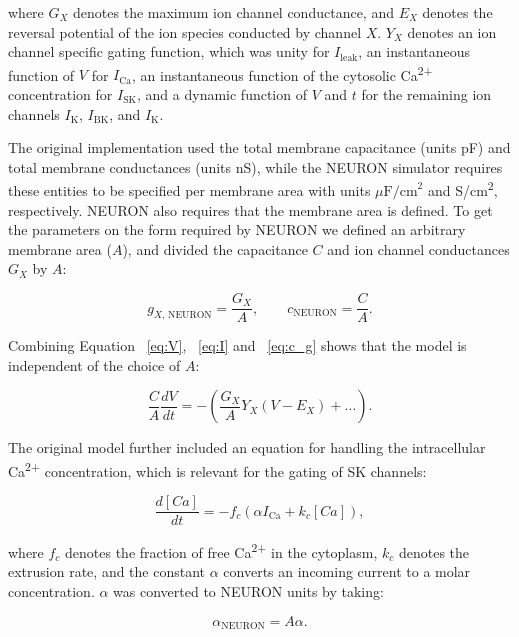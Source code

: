 \documentclass[10pt,a4paper,onecolumn]{article}
\begin{document}
\noindent
where \(G_{X}\) denotes the maximum ion channel conductance, and
\(E_{X}\) denotes the reversal potential of the ion species conducted by
channel \(X\). \(Y_X\) denotes an ion channel specific gating function,
which was unity for \(I_{\mathrm{leak}}\), an instantaneous function of
\(V\) for \(I_{\mathrm{Ca}}\), an instantaneous function of the
cytosolic Ca\textsuperscript{2+} concentration for \(I_{\mathrm{SK}}\),
and a dynamic function of \(V\) and \(t\) for the remaining ion channels
\(I_{\mathrm{K}}\), \(I_{\mathrm{BK}}\), and \(I_{\mathrm{K}}\).

The original implementation used the total membrane capacitance (units
pF) and total membrane conductances (units nS), while the NEURON
simulator requires these entities to be specified per membrane area with
units \(\mu \mathrm{F/cm}^2\) and S/cm\textsuperscript{2}, respectively.
NEURON also requires that the membrane area is defined. To get the
parameters on the form required by NEURON we defined an arbitrary
membrane area (\(A\)), and divided the capacitance \(C\) and ion channel
conductances \(G_X\) by \(A\):

\begin{equation}g_{X,\,\mathrm{NEURON}} = \frac{G_X}{A}, \qquad c_{\mathrm{NEURON}} = \frac{C}{A}.\label{eq:c_g}\end{equation}

\noindent
Combining Equation ~\ref{eq:V}, ~\ref{eq:I} and ~\ref{eq:c_g} shows that
the model is independent of the choice of \(A\):

\begin{equation}\frac{C}{A} \frac{dV}{dt} =  -\left(\frac{G_{X}}{A}Y_X(V - E_{X}) + \ldots \right).\label{eq:V_A}\end{equation}

The original model further included an equation for handling the
intracellular Ca\textsuperscript{2+} concentration, which is relevant
for the gating of SK channels:

\begin{equation}\frac{d[Ca]}{dt} = - f_c (\alpha I_{\mathrm{Ca}} + k_c[Ca]), \label{eq:Ca}\end{equation}

\noindent
where \(f_c\) denotes the fraction of free Ca\textsuperscript{2+} in the
cytoplasm, \(k_c\) denotes the extrusion rate, and the constant
\(\alpha\) converts an incoming current to a molar concentration.
\(\alpha\) was converted to NEURON units by taking:

\begin{equation}\alpha_{\mathrm{NEURON}} = A\alpha.\label{eq:alpha}\end{equation}
\end{document}
